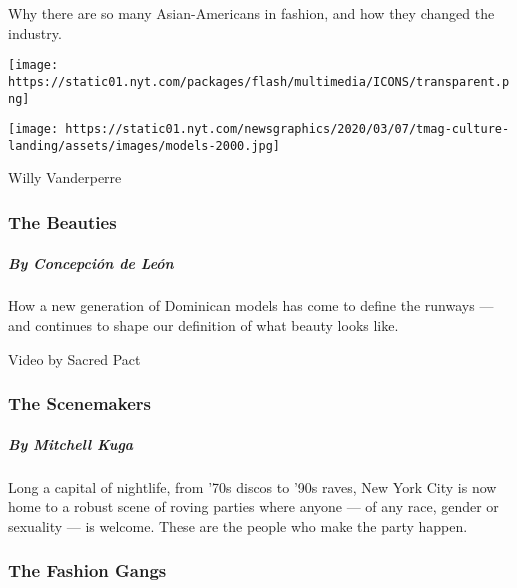 Why there are so many Asian-Americans in fashion, and how they changed
the industry.

\href{https://www.nytimes.com/interactive/2020/04/13/t-magazine/dominican-republic-models.html}{}

\texttt{[image: https://static01.nyt.com/packages/flash/multimedia/ICONS/transparent.png]}

\texttt{[image: https://static01.nyt.com/newsgraphics/2020/03/07/tmag-culture-landing/assets/images/models-2000.jpg]}

Willy Vanderperre

\hypertarget{the-beauties}{%
\subsubsection{The Beauties}\label{the-beauties}}

\hypertarget{by-concepcioux301n-de-leoux301n}{%
\subparagraph{By Concepción de
León}\label{by-concepcioux301n-de-leoux301n}}

How a new generation of Dominican models has come to define the runways
--- and continues to shape our definition of what beauty looks like.

\href{https://www.nytimes.com/interactive/2020/04/13/t-magazine/nyc-downtown-nightlife-party-scene.html}{}

Video by Sacred Pact

\hypertarget{the-scenemakers}{%
\subsubsection{The Scenemakers}\label{the-scenemakers}}

\hypertarget{by-mitchell-kuga}{%
\subparagraph{By Mitchell Kuga}\label{by-mitchell-kuga}}

Long a capital of nightlife, from '70s discos to '90s raves, New York
City is now home to a robust scene of roving parties where anyone --- of
any race, gender or sexuality --- is welcome. These are the people who
make the party happen.

\href{https://www.nytimes.com/interactive/2020/04/13/t-magazine/maria-cornejo-olivier-rousteing-telfar-clemens-alessandro-michele.html}{}

\hypertarget{the-fashion-gangs}{%
\subsubsection{The Fashion Gangs}\label{the-fashion-gangs}}


